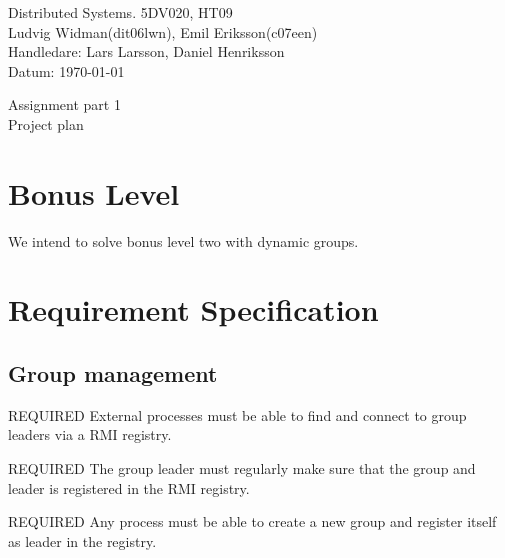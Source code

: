 \documentclass[11pt,swedish]{article}
\def\author			{Ludvig Widman(dit06lwn), Emil Eriksson(c07een)}
\def\course			{Distributed Systems. 5DV020, HT09}
\def\delivery		{Assignment part 1}
\def\trivialname	{Project plan}
\def\tutor			{Lars Larsson, Daniel Henriksson}
\begin{document}
\begin{titlepage}
\noindent
\course \\
\author \\

\noindent
Handledare: \tutor \\
Datum: \today \\


\begin{center}
		\vspace{20mm}
        \Huge \delivery \\
        \vspace{5mm}
        \Huge \trivialname \\
        \vspace{70mm}
        
\end{center}
\end{titlepage}
\thispagestyle{empty}
\tableofcontents
\newpage
{}

\setlength{\parindent}{0pt}
\setlength{\parskip}{1ex plus 0.5ex minus 0.2ex}


\section{Bonus Level}
We intend to solve bonus level two with dynamic groups. 


\section{Requirement Specification}

\subsection{Group management}
REQUIRED External processes must be able to find and connect to group leaders via a RMI registry.

REQUIRED The group leader must regularly make sure that the group and leader is registered in the RMI registry.

REQUIRED Any process must be able to create a new group and register itself as leader in the registry.
\end{document}

